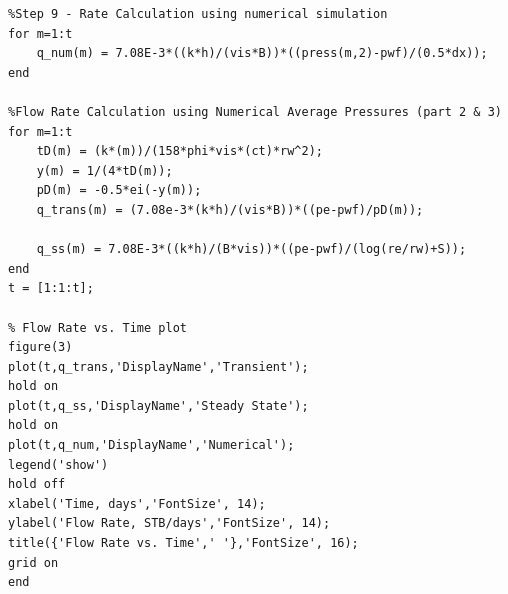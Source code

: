 \documentclass[12pt,letterpaper,titlepage]{article}
\begin{document}
\begin{verbatim}
%Step 9 - Rate Calculation using numerical simulation
for m=1:t
    q_num(m) = 7.08E-3*((k*h)/(vis*B))*((press(m,2)-pwf)/(0.5*dx));
end

%Flow Rate Calculation using Numerical Average Pressures (part 2 & 3)
for m=1:t
    tD(m) = (k*(m))/(158*phi*vis*(ct)*rw^2);
    y(m) = 1/(4*tD(m));
    pD(m) = -0.5*ei(-y(m));
    q_trans(m) = (7.08e-3*(k*h)/(vis*B))*((pe-pwf)/pD(m));
    
    q_ss(m) = 7.08E-3*((k*h)/(B*vis))*((pe-pwf)/(log(re/rw)+S));
end
t = [1:1:t];

% Flow Rate vs. Time plot
figure(3)
plot(t,q_trans,'DisplayName','Transient');
hold on
plot(t,q_ss,'DisplayName','Steady State');
hold on
plot(t,q_num,'DisplayName','Numerical');
legend('show')
hold off
xlabel('Time, days','FontSize', 14);
ylabel('Flow Rate, STB/days','FontSize', 14);
title({'Flow Rate vs. Time',' '},'FontSize', 16);
grid on
end
\end{verbatim}
\end{document}
